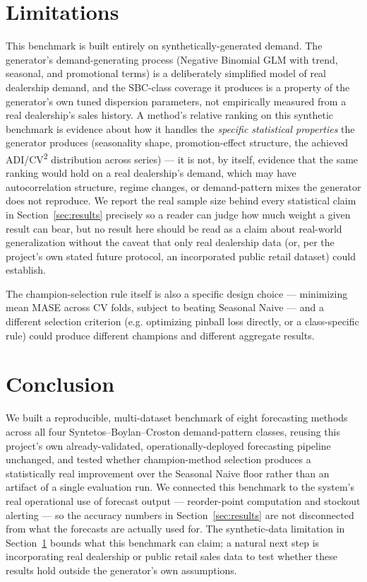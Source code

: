 \documentclass[11pt]{article}
\begin{document}
\section{Limitations}
\label{sec:limitations}

This benchmark is built entirely on synthetically-generated demand. The generator's
demand-generating process (Negative Binomial GLM with trend, seasonal, and promotional
terms) is a deliberately simplified model of real dealership demand, and the SBC-class
coverage it produces is a property of the generator's own tuned dispersion parameters,
not empirically measured from a real dealership's sales history. A method's relative
ranking on this synthetic benchmark is evidence about how it handles the \emph{specific
statistical properties} the generator produces (seasonality shape, promotion-effect
structure, the achieved ADI/CV\textsuperscript{2} distribution across series) --- it is
not, by itself, evidence that the same ranking would hold on a real dealership's demand,
which may have autocorrelation structure, regime changes, or demand-pattern mixes the
generator does not reproduce. We report the real sample size behind every statistical
claim in Section~\ref{sec:results} precisely so a reader can judge how much weight a
given result can bear, but no result here should be read as a claim about real-world
generalization without the caveat that only real dealership data (or, per the project's
own stated future protocol, an incorporated public retail dataset) could establish.

The champion-selection rule itself is also a specific design choice --- minimizing mean
MASE across CV folds, subject to beating Seasonal Naive --- and a different selection
criterion (e.g. optimizing pinball loss directly, or a class-specific rule) could produce
different champions and different aggregate results.

\section{Conclusion}

We built a reproducible, multi-dataset benchmark of eight forecasting methods across all
four Syntetos--Boylan--Croston demand-pattern classes, reusing this project's own
already-validated, operationally-deployed forecasting pipeline unchanged, and tested
whether champion-method selection produces a statistically real improvement over the
Seasonal Naive floor rather than an artifact of a single evaluation run. We connected
this benchmark to the system's real operational use of forecast output --- reorder-point
computation and stockout alerting --- so the accuracy numbers in Section~\ref{sec:results}
are not disconnected from what the forecasts are actually used for. The synthetic-data
limitation in Section~\ref{sec:limitations} bounds what this benchmark can claim; a
natural next step is incorporating real dealership or public retail sales data to test
whether these results hold outside the generator's own assumptions.



\end{document}
